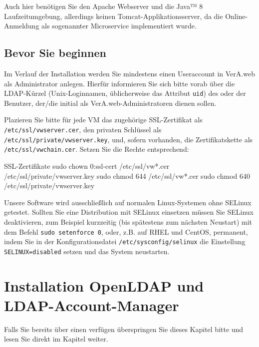 Auch hier benötigen Sie den Apache Webserver und die Java™ 8
Laufzeitumgebung, allerdings keinen Tomcat-Applikationsserver, da
die Online-Anmeldung als sogenannter Microservice implementiert wurde.

\fi%

\subsection{Bevor Sie beginnen}\label{subsec:req-prereq}

Im Verlauf der Installation werden Sie mindestens einen Useraccount
in VerA.web als Administrator anlegen. Hierfür informieren Sie sich
bitte vorab über die LDAP-Kürzel (Unix-Loginnamen, üblicherweise das
Attribut \texttt{uid}) des oder der Benutzer, der/die initial als
VerA.web-Administratoren dienen sollen.

Plazieren Sie bitte für jede VM das zugehörige SSL-Zertifikat als
\texttt{/etc/ssl/vwserver.cer}, den privaten Schlüssel als
\texttt{/etc/ssl/private/vwserver.key}, und, sofern vorhanden, die
Zertifikatskette als \texttt{/etc/ssl/vwchain.cer}. Setzen Sie die
Rechte entsprechend:\keinumbruch

\begin{minipage}{\linewidth}
\begin{lstdump}{SSL-Zertifikate}
sudo chown 0:ssl-cert /etc/ssl/vw*.cer /etc/ssl/private/vwserver.key
sudo chmod 644 /etc/ssl/vw*.cer
sudo chmod 640 /etc/ssl/private/vwserver.key
\end{lstdump}
\end{minipage}

Unsere Software wird ausschließlich auf normalen Linux-Systemen ohne
SELinux getestet. Sollten Sie eine Distribution mit SELinux einsetzen
müssen Sie SELinux deaktivieren, zum Beispiel kurzzeitig (bis spätestens
zum nächsten Neustart) mit dem Befehl \texttt{sudo setenforce 0}, oder,
z.B. auf RHEL und CentOS, permanent, indem Sie in der Konfigurationsdatei
\texttt{/etc/sysconfig/selinux} die Einstellung \texttt{SELINUX=disabled}
setzen und das System neustarten.

\section{Installation OpenLDAP und LDAP-Account-Manager}\label{sec:setup-lam}

Falls Sie bereits über einen  verfügen
überspringen Sie dieses Kapitel bitte und lesen Sie direkt im Kapitel
\ifoa
\else%
\fi%
weiter.

